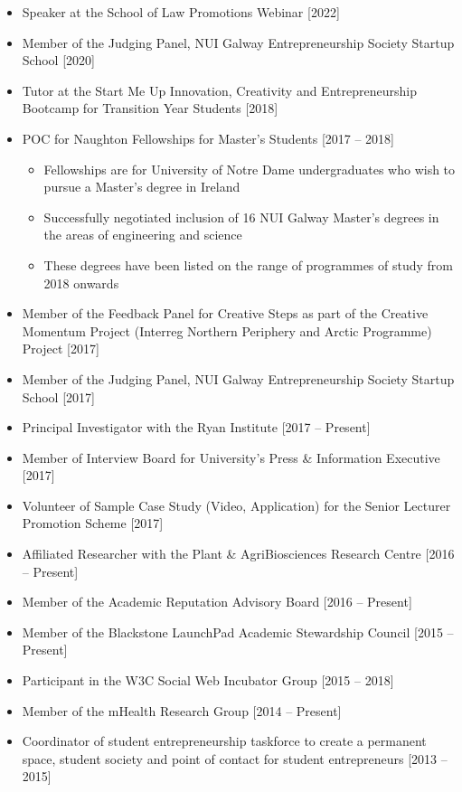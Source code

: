 \documentclass[10pt,a4paper]{res} %
\begin{document}
\begin{resume}
\begin{itemize} \itemsep -2pt
\item Speaker at the School of Law Promotions Webinar [2022]
\item Member of the Judging Panel, NUI Galway Entrepreneurship Society Startup School [2020]
\item Tutor at the Start Me Up Innovation, Creativity and Entrepreneurship Bootcamp for Transition Year Students [2018]
\item POC for Naughton Fellowships for Master's Students [2017 -- 2018]
\begin{itemize} \itemsep -2pt
\item Fellowships are for University of Notre Dame undergraduates who wish to pursue a Master's degree in Ireland
\item Successfully negotiated inclusion of 16 NUI Galway Master's degrees in the areas of engineering and science
\item These degrees have been listed on the range of programmes of study from 2018 onwards
\end{itemize}
\item Member of the Feedback Panel for Creative Steps as part of the Creative Momentum Project (Interreg Northern Periphery and Arctic Programme) Project [2017]
\item Member of the Judging Panel, NUI Galway Entrepreneurship Society Startup School [2017]
\item Principal Investigator with the Ryan Institute [2017 -- Present]
\item Member of Interview Board for University's Press \& Information Executive [2017]
\item Volunteer of Sample Case Study (Video, Application) for the Senior Lecturer Promotion Scheme [2017]
\item Affiliated Researcher with the Plant \& AgriBiosciences Research Centre [2016 -- Present]
\item Member of the Academic Reputation Advisory Board [2016 -- Present]
\item Member of the Blackstone LaunchPad Academic Stewardship Council [2015 -- Present]
\item Participant in the W3C Social Web Incubator Group [2015 -- 2018]
\item Member of the mHealth Research Group [2014 -- Present]
\item Coordinator of student entrepreneurship taskforce to create a permanent space, student society and point of contact for student entrepreneurs [2013 -- 2015]

\end{itemize}
\end{resume}
\end{document}

